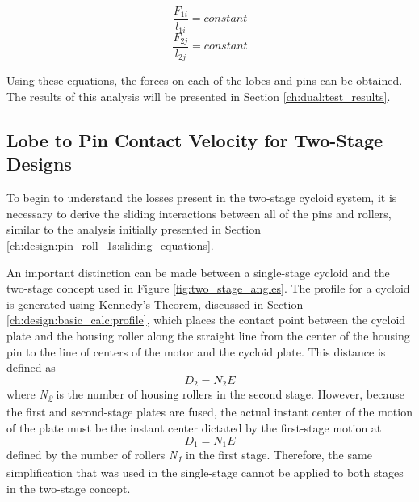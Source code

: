\begin{equation} 
\frac{F_{1i}}{l_{1i}} = constant 
\end{equation}
\begin{equation}
\frac{F_{2j}}{l_{2j}} = constant
\end{equation}

Using these equations, the forces on each of the lobes and pins can be obtained. The results of this analysis will be presented in Section \ref{ch:dual:test_results}.

\subsection{Lobe to Pin Contact Velocity for Two-Stage Designs}\label{ch:dual:equations:vel}
To begin to understand the losses present in the two-stage cycloid system, it is necessary to derive the sliding interactions between all of the pins and rollers, similar to the analysis initially presented in Section \ref{ch:design:pin_roll_1s:sliding_equations}.

An important distinction can be made between a single-stage cycloid and the two-stage concept used in Figure \ref{fig:two_stage_angles}. The profile for a cycloid is generated using Kennedy's Theorem, discussed in Section \ref{ch:design:basic_calc:profile}, which places the contact point between the cycloid plate and the housing roller along the straight line from the center of the housing pin to the line of centers of the motor and the cycloid plate. This distance is defined as 
\begin{equation}
D_2 = N_2 E
\end{equation} 
where \textit{N\textsubscript{2}} is the number of housing rollers in the second stage. However, because the first and second-stage plates are fused, the actual instant center of the motion of the plate must be the instant center dictated by the first-stage motion at 
\begin{equation}
D_1 = N_1 E 
\end{equation} 
defined by the number of rollers \textit{N\textsubscript{1}} in the first stage. Therefore, the same simplification that was used in the single-stage cannot be applied to both stages in the two-stage concept. 

